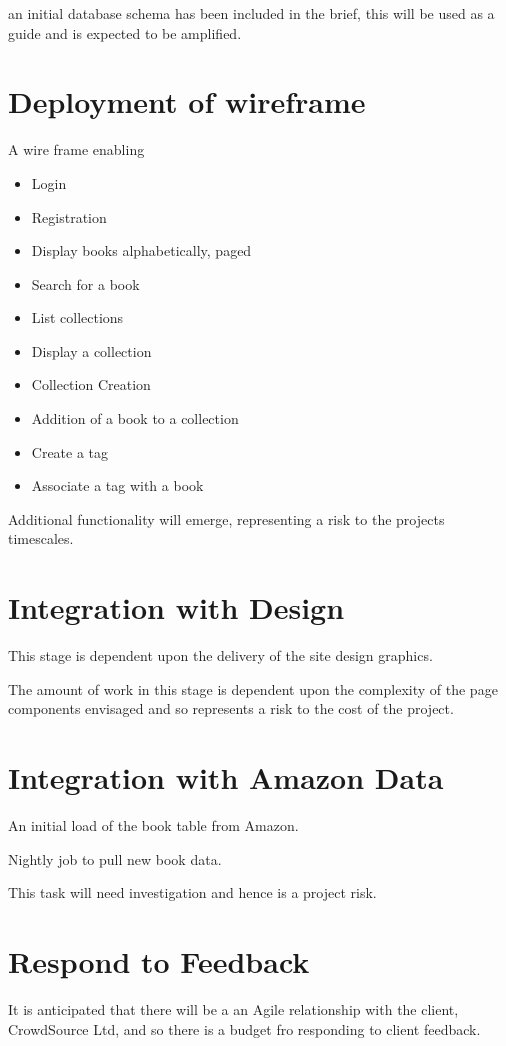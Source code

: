\documentclass [12pt, a4paper, twoside, titlepage] {article}
\begin{document}
an initial database schema has been included in the brief, this will be used as a guide and is expected to be amplified. 

\section{Deployment of wireframe}
A wire frame enabling 
\begin{itemize}
\item{Login}
\item{Registration}
\item{Display books alphabetically, paged}
\item{Search for a book}
\item{List collections}
\item{Display a collection}
\item{Collection Creation}
\item{Addition of a book to a collection}
\item{Create a tag}
\item{Associate a tag with a book}
\end{itemize}

Additional functionality will emerge, representing a risk to the projects timescales.

\section{Integration with Design}

This stage is dependent upon the delivery of the site design graphics. 

The amount of work in this stage is dependent upon the complexity of the page components envisaged and so represents a risk to the cost of the project.

\section{Integration with Amazon Data }

An initial load of the book table from Amazon. 

Nightly job to pull new book data.

This task will need investigation and hence is a project risk.

\section{Respond to Feedback}
It is anticipated that there will be a an Agile relationship with the client, CrowdSource Ltd, and so 
there is a budget fro responding to client feedback.
\end{document}
